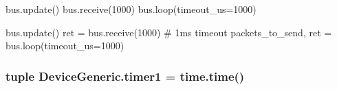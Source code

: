 bus.\-update() bus.\-receive(1000) bus.\-loop(timeout\-\_\-us=1000) 

bus.\-update() ret = bus.\-receive(1000) \# 1ms timeout packets\-\_\-to\-\_\-send, ret = bus.\-loop(timeout\-\_\-us=1000) \hypertarget{namespaceDeviceGeneric_a8d2a2f778d4e748f1bd1b6c3d91d8a46}{
\subsubsection[{timer1}]{\setlength{\rightskip}{0pt plus 5cm}tuple Device\-Generic.\-timer1 = time.\-time()}}\label{namespaceDeviceGeneric_a8d2a2f778d4e748f1bd1b6c3d91d8a46}
